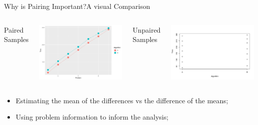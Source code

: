\begin{frame}{Why is Pairing Important?}{A visual Comparison}
  \begin{columns}
    \begin{center}
      Paired Samples
    \end{center}
    \includegraphics[width=\textwidth]{../img/2samples_paired}
      \begin{center}
        Unpaired Samples
      \end{center}
    \includegraphics[width=\textwidth]{../img/2samples_unpaired}
  \end{columns}
  \begin{itemize}
    \item Estimating the mean of the differences vs the difference of the means;
    \item Using problem information to inform the analysis;
  \end{itemize}
\end{frame}

